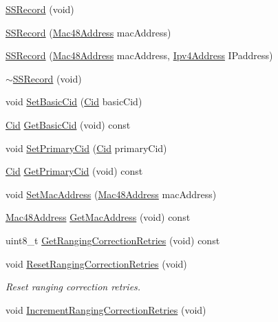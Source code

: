\begin{DoxyCompactItemize}
\item 
\hyperlink{classns3_1_1SSRecord_a3afd909d9ef99e1adafdca3c0bf4c4c1}{S\+S\+Record} (void)
\item 
\hyperlink{classns3_1_1SSRecord_a10f8c671fe963fb866c74358cda65201}{S\+S\+Record} (\hyperlink{classns3_1_1Mac48Address}{Mac48\+Address} mac\+Address)
\item 
\hyperlink{classns3_1_1SSRecord_a7cab4819bbf52a8631e9a6bcfc17beb8}{S\+S\+Record} (\hyperlink{classns3_1_1Mac48Address}{Mac48\+Address} mac\+Address, \hyperlink{classns3_1_1Ipv4Address}{Ipv4\+Address} I\+Paddress)
\item 
\hyperlink{classns3_1_1SSRecord_aa6c69cf3ab7f0ef736f96f1bcf5e8c7b}{$\sim$\+S\+S\+Record} (void)
\item 
void \hyperlink{classns3_1_1SSRecord_a69f5d904bbecda706c1a1edc585dd195}{Set\+Basic\+Cid} (\hyperlink{classns3_1_1Cid}{Cid} basic\+Cid)
\item 
\hyperlink{classns3_1_1Cid}{Cid} \hyperlink{classns3_1_1SSRecord_a29347039d1a9e3c89e07230be9914e43}{Get\+Basic\+Cid} (void) const 
\item 
void \hyperlink{classns3_1_1SSRecord_a67d8f0bfffe0d34bf3a254dcc129485f}{Set\+Primary\+Cid} (\hyperlink{classns3_1_1Cid}{Cid} primary\+Cid)
\item 
\hyperlink{classns3_1_1Cid}{Cid} \hyperlink{classns3_1_1SSRecord_ad45ea0c236a9c7f32a939e1b0e42d5b8}{Get\+Primary\+Cid} (void) const 
\item 
void \hyperlink{classns3_1_1SSRecord_a0a74064608b59f3b05fe67a9987de1ab}{Set\+Mac\+Address} (\hyperlink{classns3_1_1Mac48Address}{Mac48\+Address} mac\+Address)
\item 
\hyperlink{classns3_1_1Mac48Address}{Mac48\+Address} \hyperlink{classns3_1_1SSRecord_a19953478075015212ec2ba8c28bdc44b}{Get\+Mac\+Address} (void) const 
\item 
uint8\+\_\+t \hyperlink{classns3_1_1SSRecord_a0f1691e89f03154b9b9b1cab7ce2371f}{Get\+Ranging\+Correction\+Retries} (void) const 
\item 
void \hyperlink{classns3_1_1SSRecord_acfd85a368b4a862fc96cf492f8934e99}{Reset\+Ranging\+Correction\+Retries} (void)
\begin{DoxyCompactList}\small\item\em Reset ranging correction retries. \end{DoxyCompactList}\item 
void \hyperlink{classns3_1_1SSRecord_acb8188736cb593974760cdd0f2a19e8d}{Increment\+Ranging\+Correction\+Retries} (void)

\end{DoxyCompactItemize}
